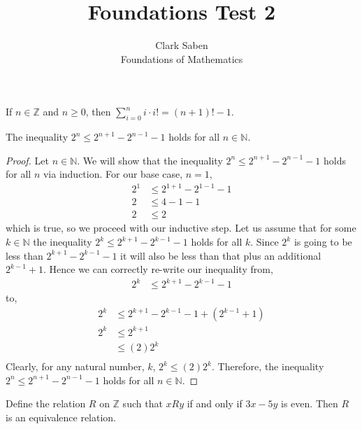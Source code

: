 \documentclass[12pt]{article}
\newenvironment{theorem}[2][Theorem]{\begin{trivlist}
\item[\hskip \labelsep {\bfseries #1}\hskip \labelsep {\bfseries #2.}]}{\end{trivlist}}
\begin{document}
 
 
\title{Foundations Test 2}%
\author{Clark Saben\\ %
Foundations of Mathematics} %
 
\maketitle

\section{}
\begin{theorem}1
	If $n \in \mathbb{Z}$ and $n \geq 0$, then $\sum_{i=0}^{n}i\cdot i! = \left(n+1 \right)!-1$.
\end{theorem}
\begin{theorem}{2 (complete)}
	The inequality $2^n \leq 2^{n+1}-2^{n-1}-1$ holds for all $n \in \mathbb{N}$.
	\begin{proof}
	Let $n \in \mathbb{N}$. We will show that 
	the inequality $2^n \leq 2^{n+1}-2^{n-1}-1$ holds for all $n$
	via induction. For our base case, $n=1$,
	\begin{align*}
		2^{1} &\leq 2^{1+1} -2^{1-1}-1\\
		2 &\leq 4-1-1\\
		2 &\leq 2
	\end{align*}
	which is true, so we proceed with our inductive step. Let us assume that for some $k \in \mathbb{N}$
	the inequality $2^k \leq 2^{k+1}-2^{k-1}-1$ holds for all $k$. Since $2^k$ is going to be less
	than $2^{k+1}-2^{k-1}-1$ it will also be less than that plus an additional $2^{k-1}+1$. Hence we can correctly
	re-write our inequality from,
	\begin{align*}
		2^k &\leq 2^{k+1}-2^{k-1}-1
	\end{align*}
	to,
	\begin{align*}
		2^k &\leq 2^{k+1}-2^{k-1}-1 + (2^{k-1}+1)\\
		2^k &\leq 2^{k+1}\\
		    &\leq (2)2^k\\
	\end{align*}
	Clearly, for any natural number, $k$, $2^k \leq (2)2^k$. Therefore,
	the inequality $2^n \leq 2^{n+1}-2^{n-1}-1$ holds for all $n \in \mathbb{N}$.

	\end{proof}
\end{theorem}
\begin{theorem}{3 (complete)}
	Define the relation $R$ on $\mathbb{Z}$ such that $xRy$ if and only if $3x-5y$ is even. Then $R$ is an equivalence relation.\\
\end{theorem}
\end{document}
